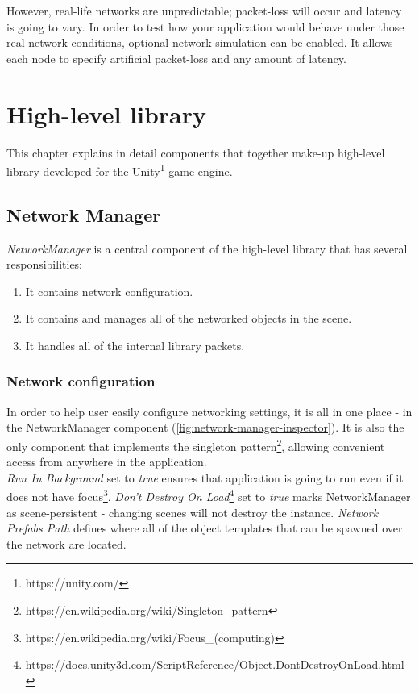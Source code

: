\documentclass[times, utf8, diplomski]{fer}
\begin{document}
However, real-life networks are unpredictable; packet-loss will occur and latency is going to vary. In order to test how your application would behave under those real network conditions, optional network simulation can be enabled. It allows each node to specify artificial packet-loss and any amount of latency.


\chapter{High-level library}
This chapter explains in detail components that together make-up high-level library developed for the Unity\footnote{https://unity.com/} game-engine.

\section{Network Manager}
\textit{NetworkManager} is a central component of the high-level library that has several responsibilities:

\begin{enumerate}
	\item It contains network configuration.
	\item It contains and manages all of the networked objects in the scene.
	\item It handles all of the internal library packets.
\end{enumerate}

\subsection{Network configuration}
In order to help user easily configure networking settings, it is all in one place - in the NetworkManager component (\ref{fig:network-manager-inspector}). It is also the only component that implements the singleton pattern\footnote{https://en.wikipedia.org/wiki/Singleton\_pattern}, allowing convenient access from anywhere in the application.\\

\textit{Run In Background} set to \textit{true} ensures that application is going to run even if it does not have focus\footnote{https://en.wikipedia.org/wiki/Focus\_(computing)}. \textit{Don't Destroy On Load}\footnote{https://docs.unity3d.com/ScriptReference/Object.DontDestroyOnLoad.html} set to \textit{true} marks NetworkManager as scene-persistent - changing scenes will not destroy the instance. \textit{Network Prefabs Path} defines where all of the object templates that can be spawned over the network are located.\\
\end{document}
